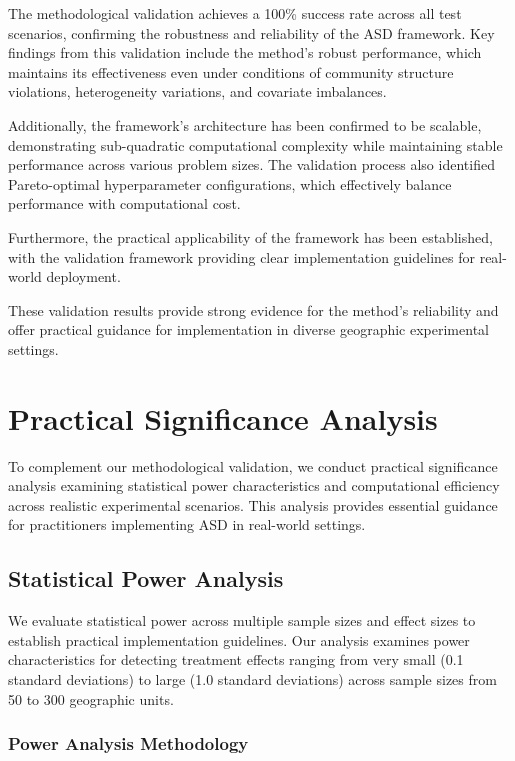 \documentclass[final,3p,fleqn, 10pt]{elsarticle}
\begin{document}
The methodological validation achieves a 100\% success rate across all test scenarios, confirming the robustness and reliability of the ASD framework. Key findings from this validation include the method's robust performance, which maintains its effectiveness even under conditions of community structure violations, heterogeneity variations, and covariate imbalances.

Additionally, the framework's architecture has been confirmed to be scalable, demonstrating sub-quadratic computational complexity while maintaining stable performance across various problem sizes. The validation process also identified Pareto-optimal hyperparameter configurations, which effectively balance performance with computational cost.

Furthermore, the practical applicability of the framework has been established, with the validation framework providing clear implementation guidelines for real-world deployment.

These validation results provide strong evidence for the method's reliability and offer practical guidance for implementation in diverse geographic experimental settings.

\section{Practical Significance Analysis}
\label{sec:practical_significance}

To complement our methodological validation, we conduct practical significance analysis examining statistical power characteristics and computational efficiency across realistic experimental scenarios. This analysis provides essential guidance for practitioners implementing ASD in real-world settings.

\subsection{Statistical Power Analysis}

We evaluate statistical power across multiple sample sizes and effect sizes to establish practical implementation guidelines. Our analysis examines power characteristics for detecting treatment effects ranging from very small (0.1 standard deviations) to large (1.0 standard deviations) across sample sizes from 50 to 300 geographic units.

\subsubsection{Power Analysis Methodology}
\end{document}
